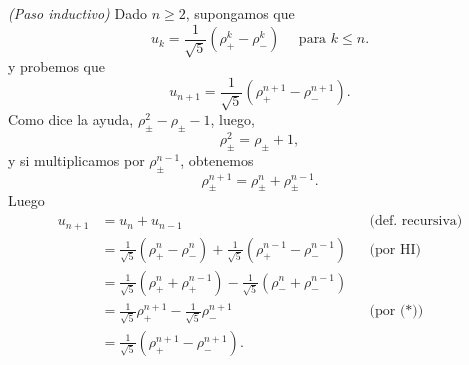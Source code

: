 \begin{enumerate}
    \textit{(Paso  inductivo)} Dado $n \ge 2$, supongamos que 
    \begin{equation}
        u_{k}= \frac{1}{\sqrt{5}}(\rho_+^{k} - \rho_-^{k})\quad \text{ para }k \le n. \tag{HI}
    \end{equation}
    y probemos que 
    \begin{equation*}
        u_{n+1}= \frac{1}{\sqrt{5}}(\rho_+^{n+1} - \rho_-^{n+1}).
    \end{equation*}
    Como dice la ayuda, $\rho_\pm^2 - \rho_\pm - 1$, luego, 
    $$
    \rho_\pm^2 = \rho_\pm + 1,
    $$ 
    y  si multiplicamos por  $ \rho_\pm^{n-1}$, obtenemos
    \begin{equation*}
        \rho_\pm^{n+1} = \rho_\pm^{n} + \rho_\pm^{n-1}. \tag{*}
    \end{equation*}
    Luego 
    \begin{align*}
        u_{n+1}&=  u_n + u_{n-1}&&\text{(def. recursiva)}\\
        &= \frac{1}{\sqrt{5}}(\rho_+^{n} - \rho_-^{n}) + \frac{1}{\sqrt{5}}(\rho_+^{n-1} - \rho_-^{n-1})&&\text{(por HI)}\\
        &= \frac{1}{\sqrt{5}}(\rho_+^{n} + \rho_+^{n-1}) - \frac{1}{\sqrt{5}}(\rho_-^{n} +\rho_-^{n-1})&&\\
        &= \frac{1}{\sqrt{5}}\rho_+^{n+1} - \frac{1}{\sqrt{5}}\rho_-^{n+1}&&\text{(por (*))}\\
        &=\frac{1}{\sqrt{5}}(\rho_+^{n+1} - \rho_-^{n+1}).&&
    \end{align*}
\end{enumerate}


